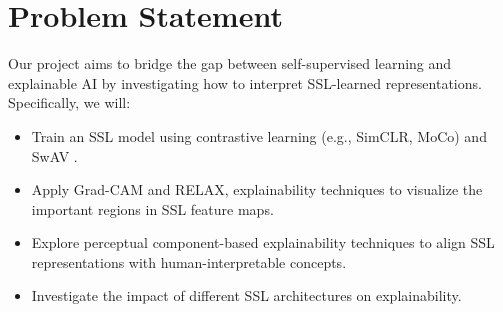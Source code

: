 \section{Problem Statement}
\label{sec:problem_statement}

Our project aims to bridge the gap between self-supervised learning and explainable AI by investigating how to interpret SSL-learned representations. Specifically, we will:
\begin{itemize}
    \item Train an SSL model using contrastive learning (e.g., SimCLR\cite{chen2020simple}, MoCo\cite{he2020momentum}) and SwAV \cite{caron2020unsupervised}.
    \item Apply Grad-CAM\cite{Selvaraju_2017_ICCV} and RELAX\cite{wickstrom2023relax},  explainability techniques to visualize the important regions in SSL feature maps.
    \item Explore perceptual component-based \cite{yarici2024explaining} explainability techniques to align SSL representations with human-interpretable concepts.
    \item Investigate the impact of different SSL architectures on explainability.
\end{itemize}
